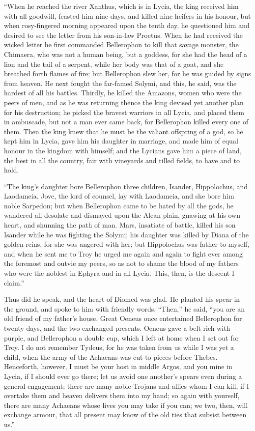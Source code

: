 “When he reached the river Xanthus, which is in Lycia, the king received
him with all goodwill, feasted him nine days, and killed nine heifers in
his honour, but when rosy-fingered morning appeared upon the tenth day, he
questioned him and desired to see the letter from his son-in-law Proetus.
When he had received the wicked letter he first commanded Bellerophon to
kill that savage monster, the Chimaera, who was not a human being, but a
goddess, for she had the head of a lion and the tail of a serpent, while
her body was that of a goat, and she breathed forth flames of fire; but
Bellerophon slew her, for he was guided by signs from heaven. He next
fought the far-famed Solymi, and this, he said, was the hardest of all his
battles. Thirdly, he killed the Amazons, women who were the peers of men,
and as he was returning thence the king devised yet another plan for his
destruction; he picked the bravest warriors in all Lycia, and placed them
in ambuscade, but not a man ever came back, for Bellerophon killed every
one of them. Then the king knew that he must be the valiant offspring of a
god, so he kept him in Lycia, gave him his daughter in marriage, and made
him of equal honour in the kingdom with himself; and the Lycians gave him
a piece of land, the best in all the country, fair with vineyards and
tilled fields, to have and to hold.

“The king’s daughter bore Bellerophon three children, Isander,
Hippolochus, and Laodameia. Jove, the lord of counsel, lay with Laodameia,
and she bore him noble Sarpedon; but when Bellerophon came to be hated by
all the gods, he wandered all desolate and dismayed upon the Alean plain,
gnawing at his own heart, and shunning the path of man. Mars, insatiate of
battle, killed his son Isander while he was fighting the Solymi; his
daughter was killed by Diana of the golden reins, for she was angered with
her; but Hippolochus was father to myself, and when he sent me to Troy he
urged me again and again to fight ever among the foremost and outvie my
peers, so as not to shame the blood of my fathers who were the noblest in
Ephyra and in all Lycia. This, then, is the descent I claim.”

Thus did he speak, and the heart of Diomed was glad. He planted his spear
in the ground, and spoke to him with friendly words. “Then,” he said, “you
are an old friend of my father’s house. Great Oeneus once entertained
Bellerophon for twenty days, and the two exchanged presents. Oeneus gave a
belt rich with purple, and Bellerophon a double cup, which I left at home
when I set out for Troy. I do not remember Tydeus, for he was taken from
us while I was yet a child, when the army of the Achaeans was cut to
pieces before Thebes. Henceforth, however, I must be your host in middle
Argos, and you mine in Lycia, if I should ever go there; let us avoid one
another’s spears even during a general engagement; there are many noble
Trojans and allies whom I can kill, if I overtake them and heaven delivers
them into my hand; so again with yourself, there are many Achaeans whose
lives you may take if you can; we two, then, will exchange armour, that
all present may know of the old ties that subsist between us.”

